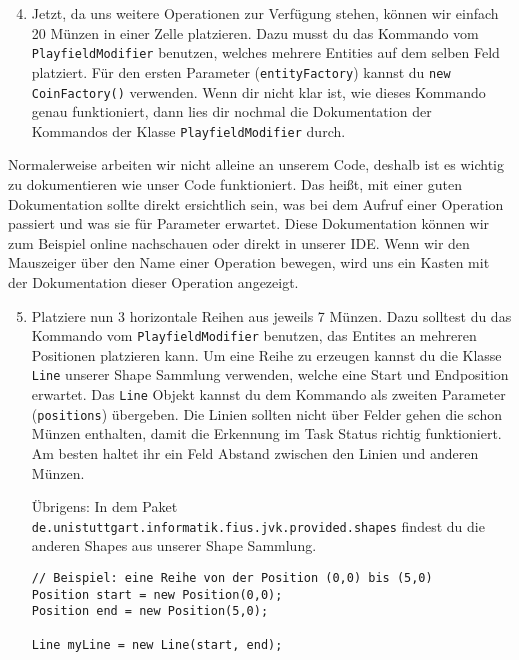 \begin{enumerate} \setcounter{enumi}{3}
    \item Jetzt, da uns weitere Operationen zur Verfügung stehen, können wir einfach 20 Münzen in einer Zelle platzieren.
        Dazu musst du das Kommando vom \lstinline{PlayfieldModifier} benutzen, welches mehrere Entities auf dem selben Feld platziert.
        Für den ersten Parameter (\lstinline{entityFactory}) kannst du \lstinline{new CoinFactory()} verwenden.
        Wenn dir nicht klar ist, wie dieses Kommando genau funktioniert, dann lies dir nochmal die Dokumentation der Kommandos der Klasse \lstinline{PlayfieldModifier} durch.
\end{enumerate}

\begin{Infobox}
    Normalerweise arbeiten wir nicht alleine an unserem Code, deshalb ist es wichtig zu dokumentieren wie unser Code funktioniert.
    Das heißt, mit einer guten Dokumentation sollte direkt ersichtlich sein, was bei dem Aufruf einer Operation passiert und was sie für Parameter erwartet.
    Diese Dokumentation können wir zum Beispiel online nachschauen oder direkt in unserer IDE.
    Wenn wir den Mauszeiger über den Name einer Operation bewegen, wird uns ein Kasten mit der Dokumentation dieser Operation angezeigt.
\end{Infobox}


\begin{enumerate} \setcounter{enumi}{4}
    \item Platziere nun 3 horizontale Reihen aus jeweils 7 Münzen.
        Dazu solltest du das Kommando vom \lstinline{PlayfieldModifier} benutzen, das Entites an mehreren Positionen platzieren kann.
        Um eine Reihe zu erzeugen kannst du die Klasse \lstinline{Line} unserer Shape Sammlung verwenden, welche eine Start und Endposition erwartet.
        Das \lstinline{Line} Objekt kannst du dem Kommando als zweiten Parameter (\lstinline{positions}) übergeben.
        Die Linien sollten nicht über Felder gehen die schon Münzen enthalten, damit die Erkennung im Task Status richtig funktioniert.
        Am besten haltet ihr ein Feld Abstand zwischen den Linien und anderen Münzen.

        Übrigens: In dem Paket \texttt{de.unistuttgart.informatik.fius.jvk.provided.shapes} findest du die anderen Shapes aus unserer Shape Sammlung.

    \begin{lstlisting}
// Beispiel: eine Reihe von der Position (0,0) bis (5,0)
Position start = new Position(0,0);
Position end = new Position(5,0);

Line myLine = new Line(start, end);
    \end{lstlisting}

\end{enumerate}
